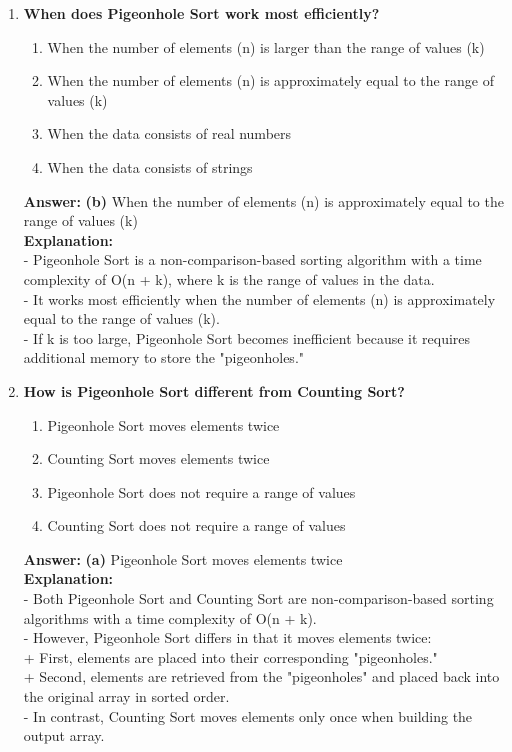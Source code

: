 \begin{enumerate}
    \item \textbf{When does Pigeonhole Sort work most efficiently?}
    \begin{enumerate}
        \item When the number of elements (n) is larger than the range of values (k)
        \item When the number of elements (n) is approximately equal to the range of values (k)
        \item When the data consists of real numbers
        \item When the data consists of strings
    \end{enumerate}
    \textbf{Answer:} \textbf{(b)} When the number of elements (n) is approximately equal to the range of values (k) \\
    \textbf{Explanation:} \\
    - Pigeonhole Sort is a non-comparison-based sorting algorithm with a time complexity of O(n + k), where k is the range of values in the data. \\
    - It works most efficiently when the number of elements (n) is approximately equal to the range of values (k). \\
    - If k is too large, Pigeonhole Sort becomes inefficient because it requires additional memory to store the "pigeonholes."
    
    \item \textbf{How is Pigeonhole Sort different from Counting Sort?}
    \begin{enumerate}
        \item Pigeonhole Sort moves elements twice
        \item Counting Sort moves elements twice
        \item Pigeonhole Sort does not require a range of values
        \item Counting Sort does not require a range of values
    \end{enumerate}
    \textbf{Answer:} \textbf{(a)} Pigeonhole Sort moves elements twice \\
    \textbf{Explanation:} \\
    - Both Pigeonhole Sort and Counting Sort are non-comparison-based sorting algorithms with a time complexity of O(n + k). \\
    - However, Pigeonhole Sort differs in that it moves elements twice: \\
    + First, elements are placed into their corresponding "pigeonholes." \\
    + Second, elements are retrieved from the "pigeonholes" and placed back into the original array in sorted order. \\
    - In contrast, Counting Sort moves elements only once when building the output array.
    

\end{enumerate}

